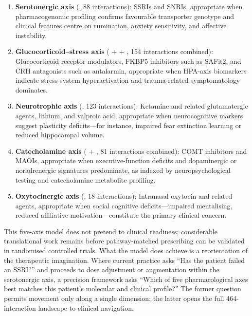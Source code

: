 \begin{enumerate}
    \item \textbf{Serotonergic axis} (, 88 interactions):
    SSRIs and SNRIs, appropriate when pharmacogenomic profiling confirms
    favourable transporter genotype and clinical features centre on
    rumination, anxiety sensitivity, and affective instability.

    \item \textbf{Glucocorticoid--stress axis} ( +  +
    , 154 interactions combined): Glucocorticoid receptor
    modulators, FKBP5 inhibitors such as SAFit2, and CRH antagonists such as
    antalarmin, appropriate when HPA-axis biomarkers indicate
    stress-system hyperactivation and trauma-related symptomatology dominates.

    \item \textbf{Neurotrophic axis} (, 123 interactions):
    Ketamine and related glutamatergic agents, lithium, and valproic acid,
    appropriate when neurocognitive markers suggest plasticity deficits---for
    instance, impaired fear extinction learning or reduced hippocampal volume.

    \item \textbf{Catecholamine axis} ( + , 81
    interactions combined): COMT inhibitors and MAOIs, appropriate when
    executive-function deficits and dopaminergic or noradrenergic signatures
    predominate, as indexed by neuropsychological testing and catecholamine
    metabolite profiling.

    \item \textbf{Oxytocinergic axis} (, 18 interactions):
    Intranasal oxytocin and related agents, appropriate when social
    cognitive deficits---impaired mentalising, reduced affiliative
    motivation---constitute the primary clinical concern.
\end{enumerate}

This five-axis model does not pretend to clinical readiness; considerable
translational work remains before pathway-matched prescribing can be validated
in randomised controlled trials. What the model does achieve is a
reorientation of the therapeutic imagination. Where current practice asks ``Has
the patient failed an SSRI?'' and proceeds to dose adjustment or augmentation
within the serotonergic axis, a precision framework asks ``Which of five
pharmacological axes best matches this patient's molecular and clinical
profile?'' The former question permits movement only along a single dimension;
the latter opens the full 464-interaction landscape to clinical navigation.

